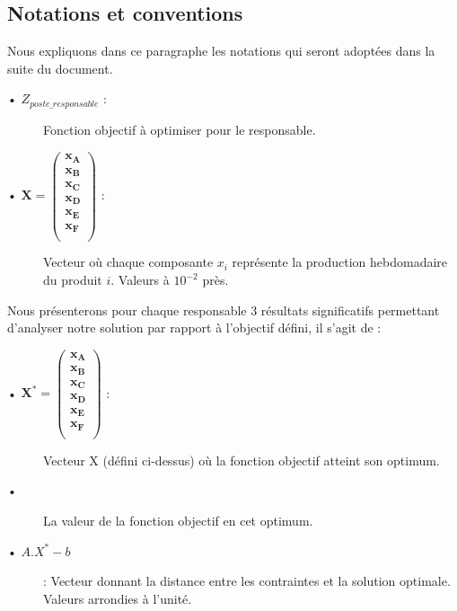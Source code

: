 \documentclass[12pt]{article}
\begin{document}
\subsection{Notations et conventions}
Nous expliquons dans ce paragraphe les notations qui seront adoptées dans la suite du document.
\begin{description}
\item[• $Z_{poste\_responsable}$ :] Fonction objectif à optimiser pour le responsable.
\item[• $\mathbf{X = 
   \left (
   \begin{array}{c}
      x_{A} \\
      x_{B} \\
      x_{C} \\
      x_{D} \\
      x_{E} \\
      x_{F} \\
   \end{array}
   \right )
 } $ :] Vecteur où chaque composante $x_{i}$ représente la production hebdomadaire du produit $i$. Valeurs à $10^{-2}$ près.
\end{description}
Nous présenterons pour chaque responsable 3 résultats significatifs permettant d'analyser notre solution par rapport à l'objectif défini, il s'agit de :
\begin{description}
\item[• $\mathbf{X^{*} = 
   \left (
   \begin{array}{c}
      x_{A} \\
      x_{B} \\
      x_{C} \\
      x_{D} \\
      x_{E} \\
      x_{F} \\
   \end{array}
   \right )
 } $ :] Vecteur X (défini ci-dessus) où la fonction objectif atteint son optimum.
 \item[• ] La valeur de la fonction objectif en cet optimum.
 \item[• $A.X^{*}-b$] : Vecteur donnant la distance entre les contraintes et la solution optimale. Valeurs arrondies à l'unité.
 
\end{description}
\end{document}
